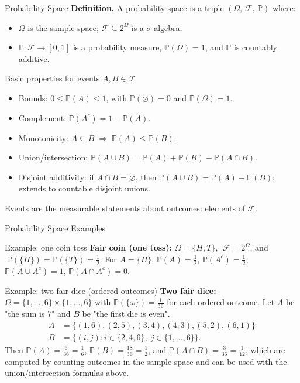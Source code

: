 \documentclass{beamer}
\renewcommand{\P}{\mathbb{P}}
\newcommand{\1}{\mathbf{1}}
\begin{document}
\begin{frame}{Probability Space}
  \textbf{Definition.} A probability space is a triple $(\Omega,\,\mathcal{F},\,\P)$ where:
  \begin{itemize}
    \item $\Omega$ is the sample space; $\mathcal{F}\subseteq 2^{\Omega}$ is a $\sigma$-algebra;
    \item $\P:\mathcal{F}\to[0,1]$ is a probability measure, $\P(\Omega)=1$, and $\P$ is countably additive.
  \end{itemize}
  \medskip
  \begin{block}{Basic properties for events $A,B\in\mathcal{F}$}
    \begin{itemize}
        \setlength{\itemsep}{0.25em}
      \item Bounds: $0\le \P(A)\le 1$, with $\P(\varnothing)=0$ and $\P(\Omega)=1$.
      \item Complement: $\P(A^c)=1-\P(A)$.
      \item Monotonicity: $A\subseteq B\;\Rightarrow\; \P(A)\le \P(B)$.
      \item Union/intersection: $\P(A\cup B)=\P(A)+\P(B)-\P(A\cap B)$.
      \item Disjoint additivity: if $A\cap B=\varnothing$, then $\P(A\cup B)=\P(A)+\P(B)$; extends to countable disjoint unions.
    \end{itemize}
  \end{block}
  {\small Events are the measurable statements about outcomes: elements of $\mathcal{F}$.}
\end{frame}

\begin{frame}{Probability Space \textemdash{} Examples}
  \begin{exampleblock}{Example: one coin toss}
    \textbf{Fair coin (one toss):} $\Omega=\{H,T\}$, $\;\mathcal{F}=2^{\Omega}$, and $\;\P(\{H\})=\P(\{T\})=\tfrac12$. For $A=\{H\}$, $\P(A)=\tfrac12$, $\P(A^c)=\tfrac12$, $\P(A\cup A^c)=1$, $\P(A\cap A^c)=0$.
  \end{exampleblock}

  \begin{exampleblock}{Example: two fair dice (ordered outcomes)}
    \textbf{Two fair dice:} $\Omega=\{1,\dots,6\}\times\{1,\dots,6\}$ with $\P(\{\omega\})=\tfrac{1}{36}$ for each ordered outcome.
    Let \(A\) be "the sum is 7" and \(B\) be "the first die is even".
    \begin{align*}
      A &= \{(1,6),(2,5),(3,4),(4,3),(5,2),(6,1)\} \\
      B &= \{(i,j):i\in\{2,4,6\},\;j\in\{1,\dots,6\}\}.
    \end{align*}
    Then
    $\P(A)=\tfrac{6}{36}=\tfrac{1}{6}$, $\P(B)=\tfrac{18}{36}=\tfrac{1}{2}$, and
    $\P(A\cap B)=\tfrac{3}{36}=\tfrac{1}{12}$, which are computed by counting outcomes in the sample space and can be used with the union/intersection formulas above.
  \end{exampleblock}
\end{frame}
\end{document}
